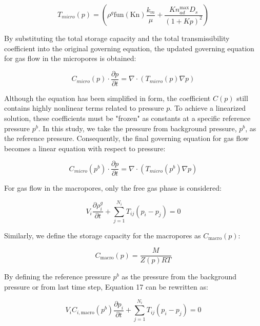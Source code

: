 \documentclass{article}
\begin{document}
\begin{equation}
    T_{m i c r o}(p)=\left(\rho^{g} \text{fun}(\text{Kn}) \frac{k_{m}}{\mu}+\frac{K n_{a d}^{\max } D_{s}}{(1+K p)^{2}}\right)
\end{equation}

By substituting the total storage capacity and the total transmissibility coefficient into the original governing equation, the updated governing equation for gas flow in the micropores is obtained:

\begin{equation}
    C_{m i c r o}(p) \cdot \frac{\partial p}{\partial t}=\nabla \cdot\left(T_{m i c r o}(p) \nabla p\right)
\end{equation}

Although the equation has been simplified in form, the coefficient $C(p)$ still contains highly nonlinear terms related to pressure $p$. To achieve a linearized solution, these coefficients must be "frozen" as constants at a specific reference pressure $p^{b}$. In this study, we take the pressure from background pressure, $p^b$, as the reference pressure. Consequently, the final governing equation for gas flow becomes a linear equation with respect to pressure:

\begin{equation}
    C_{m i c r o}(p^{b}) \cdot \frac{\partial p}{\partial t}=\nabla \cdot\left(T_{m i c r o}(p^{b}) \nabla p\right)
\end{equation}

For gas flow in the macropores, only the free gas phase is considered:

\begin{equation}
    V_{i} \frac{\partial \rho_{i}^{g}}{\partial t}+\sum_{j=1}^{N_{i}} T_{i j}\left(p_{i}-p_{j}\right)=0
\end{equation}

Similarly, we define the storage capacity for the macropores as $C_{\text{macro}}(p)$:

\begin{equation}
    C_{\text{macro}}(p)=\frac{M}{Z(p) R T}
\end{equation}

By defining the reference pressure $p^{b}$ as the pressure from the background pressure or from last time step, Equation 17 can be rewritten as:

\begin{equation}
    V_{i} C_{i, \text{macro}}(p^{b}) \frac{\partial p_{i}}{\partial t}+\sum_{j=1}^{N_{i}} T_{i j}\left(p_{i}-p_{j}\right)=0
\end{equation}
\end{document}
